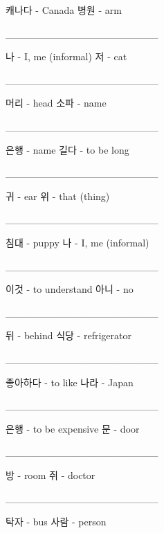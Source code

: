 \documentclass[addpoints, 30pt]{../exam}%
\begin{document}
\begin{questions}
\begin{choices}
\CorrectChoice%
캐나다 {-} Canada%
\choice%
병원 {-} arm%
\end{choices}%
\question[1]%
\_\_\_\_\_\_\_\_\_\_\_\_\_\_\_\_\_\_\_\_\_%
\begin{choices}%
\CorrectChoice%
나 {-} I, me (informal)%
\choice%
저 {-} cat%
\end{choices}%
\question[1]%
\_\_\_\_\_\_\_\_\_\_\_\_\_\_\_\_\_\_\_\_\_%
\begin{choices}%
\CorrectChoice%
머리 {-} head%
\choice%
소파 {-} name%
\end{choices}%
\question[1]%
\_\_\_\_\_\_\_\_\_\_\_\_\_\_\_\_\_\_\_\_\_%
\begin{choices}%
\choice%
은행 {-} name%
\CorrectChoice%
길다 {-} to be long%
\end{choices}%
\question[1]%
\_\_\_\_\_\_\_\_\_\_\_\_\_\_\_\_\_\_\_\_\_%
\begin{choices}%
\CorrectChoice%
귀 {-} ear%
\choice%
위 {-} that (thing)%
\end{choices}%
\question[1]%
\_\_\_\_\_\_\_\_\_\_\_\_\_\_\_\_\_\_\_\_\_%
\begin{choices}%
\choice%
침대 {-} puppy%
\CorrectChoice%
나 {-} I, me (informal)%
\end{choices}%
\question[1]%
\_\_\_\_\_\_\_\_\_\_\_\_\_\_\_\_\_\_\_\_\_%
\begin{choices}%
\choice%
이것 {-} to understand%
\CorrectChoice%
아니 {-} no%
\end{choices}%
\question[1]%
\_\_\_\_\_\_\_\_\_\_\_\_\_\_\_\_\_\_\_\_\_%
\begin{choices}%
\CorrectChoice%
뒤 {-} behind%
\choice%
식당 {-} refrigerator%
\end{choices}%
\question[1]%
\_\_\_\_\_\_\_\_\_\_\_\_\_\_\_\_\_\_\_\_\_%
\begin{choices}%
\CorrectChoice%
좋아하다 {-} to like%
\choice%
나라 {-} Japan%
\end{choices}%
\question[1]%
\_\_\_\_\_\_\_\_\_\_\_\_\_\_\_\_\_\_\_\_\_%
\begin{choices}%
\choice%
은행 {-} to be expensive%
\CorrectChoice%
문 {-} door%
\end{choices}%
\question[1]%
\_\_\_\_\_\_\_\_\_\_\_\_\_\_\_\_\_\_\_\_\_%
\begin{choices}%
\CorrectChoice%
방 {-} room%
\choice%
쥐 {-} doctor%
\end{choices}%
\question[1]%
\_\_\_\_\_\_\_\_\_\_\_\_\_\_\_\_\_\_\_\_\_%
\begin{choices}%
\choice%
탁자 {-} bus%
\CorrectChoice%
사람 {-} person%
\end{choices}%

\end{questions}
\end{document}
